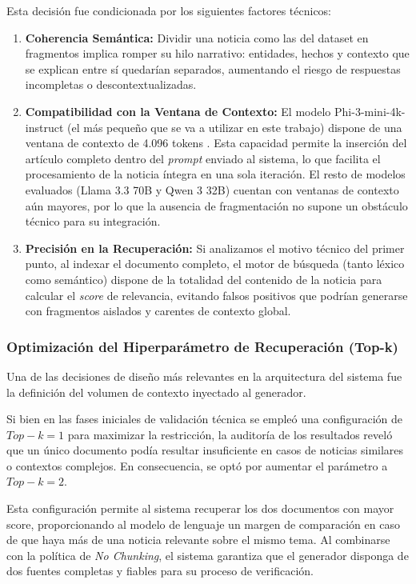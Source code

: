 Esta decisión fue condicionada por los siguientes factores técnicos:
\begin{enumerate}
    \item \textbf{Coherencia Semántica:} Dividir una noticia como las del dataset en fragmentos implica romper su hilo narrativo: entidades, hechos y contexto que se explican entre sí quedarían separados, aumentando el riesgo de respuestas incompletas o descontextualizadas.
    \item \textbf{Compatibilidad con la Ventana de Contexto:} El modelo Phi-3-mini-4k-instruct (el más pequeño que se va a utilizar en este trabajo) dispone de una ventana de contexto de 4.096 tokens \cite{abdin2024phi3}. Esta capacidad permite la inserción del artículo completo dentro del \textit{prompt} enviado al sistema, lo que facilita el procesamiento de la noticia íntegra en una sola iteración. El resto de modelos evaluados (Llama 3.3 70B y Qwen 3 32B) cuentan con ventanas de contexto aún mayores, por lo que la ausencia de fragmentación no supone un obstáculo técnico para su integración.
    \item \textbf{Precisión en la Recuperación:} Si analizamos el motivo técnico del primer punto, al indexar el documento completo, el motor de búsqueda (tanto léxico como semántico) dispone de la totalidad del contenido de la noticia para calcular el \textit{score} de relevancia, evitando falsos positivos que podrían generarse con fragmentos aislados y carentes de contexto global.
\end{enumerate}

\subsubsection{Optimización del Hiperparámetro de Recuperación (Top-k)}

Una de las decisiones de diseño más relevantes en la arquitectura del sistema fue la definición del volumen de contexto inyectado al generador. 

Si bien en las fases iniciales de validación técnica se empleó una configuración de \textbf{$Top-k=1$} para maximizar la restricción, la auditoría de los resultados reveló que un único documento podía resultar insuficiente en casos de noticias similares o contextos complejos. En consecuencia, se optó por aumentar el parámetro a \textbf{$Top-k=2$}. 

Esta configuración permite al sistema recuperar los dos documentos con mayor score, proporcionando al modelo de lenguaje un margen de comparación en caso de que haya más de una noticia relevante sobre el mismo tema. Al combinarse con la política de \textit{No Chunking}, el sistema garantiza que el generador disponga de dos fuentes completas y fiables para su proceso de verificación.

